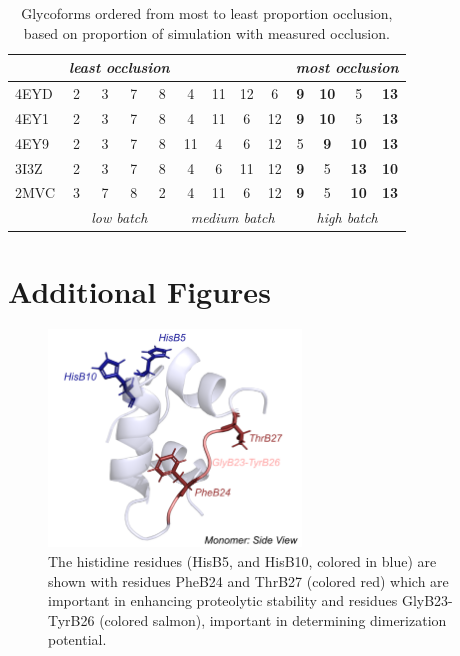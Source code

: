 \documentclass[sn-vancouver]{sn-jnl}
\begin{document}
\renewcommand{\thetable}{S\arabic{table}}
\begin{table}[ht]
\caption{Glycoforms ordered from most to least proportion occlusion, based on proportion of simulation with measured occlusion.}
\label{supple_tab: occlusion_tab}
\centering
\begin{tabular} {|l| c c c c c c c c c c c c|}
    \hline
     & \multicolumn{4}{c}{\textit{least occlusion}} &&& & & \multicolumn{4}{c|}{\textit{most occlusion}}\\
    \hline     
    4EYD&2&3&7&8&4&11&12&6&\textbf{9}&\textbf{10}&5&\textbf{13}\\
    4EY1&2&3&7&8&4&11&6&12&\textbf{9}&\textbf{10}&5&\textbf{13}\\
    4EY9&2&3&7&8&11&4&6&12&5&\textbf{9}&\textbf{10}&\textbf{13}\\
    3I3Z&2&3&7&8&4&6&11&12&\textbf{9}&5&\textbf{13}&\textbf{10}\\
    2MVC&3&7&8&2&4&11&6&12&\textbf{9}&5&\textbf{10}&\textbf{13}\\
    \hline
    & \multicolumn{4}{c|}{\textit{low batch}} & \multicolumn{4}{c|}{\textit{medium batch}} & \multicolumn{4}{c|}{\textit{high batch}}\\
    \hline
\end{tabular}
\end{table}

\section{Additional Figures}
\renewcommand{\thefigure}{S\arabic{figure}}
\begin{figure}[H]
\centering
\includegraphics[width=0.6\textwidth]{Figures/Fig_histidine_WT.png}
\caption{The histidine residues (HisB5, and HisB10, colored in blue) are shown with residues PheB24 and ThrB27 (colored red) which are important in enhancing proteolytic stability and residues GlyB23-TyrB26 (colored salmon), important in determining dimerization potential.}
\label{supple_fig: WT_hist}
\end{figure}
\end{document}
